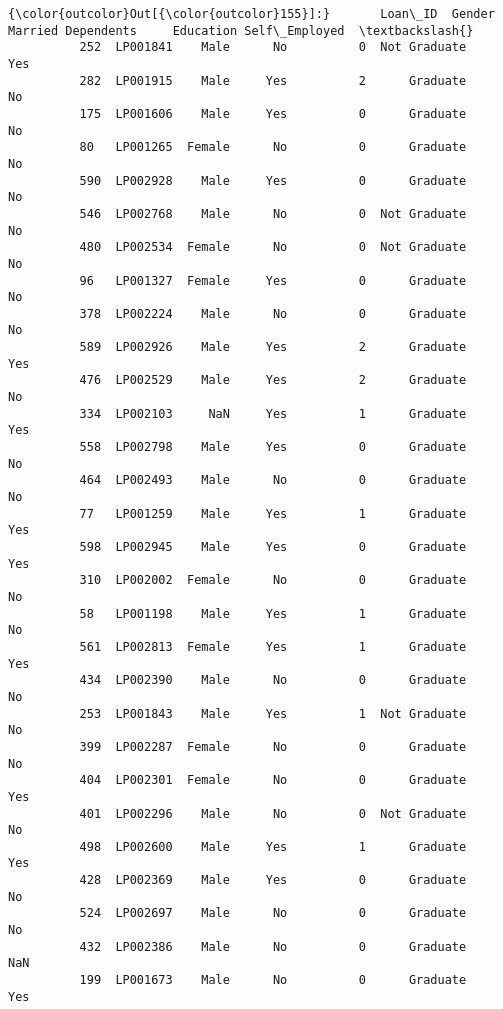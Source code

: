 \documentclass[11pt]{article}
\begin{document}
\begin{Verbatim}[commandchars=\\\{\}]
{\color{outcolor}Out[{\color{outcolor}155}]:}       Loan\_ID  Gender Married Dependents     Education Self\_Employed  \textbackslash{}
          252  LP001841    Male      No          0  Not Graduate           Yes   
          282  LP001915    Male     Yes          2      Graduate            No   
          175  LP001606    Male     Yes          0      Graduate            No   
          80   LP001265  Female      No          0      Graduate            No   
          590  LP002928    Male     Yes          0      Graduate            No   
          546  LP002768    Male      No          0  Not Graduate            No   
          480  LP002534  Female      No          0  Not Graduate            No   
          96   LP001327  Female     Yes          0      Graduate            No   
          378  LP002224    Male      No          0      Graduate            No   
          589  LP002926    Male     Yes          2      Graduate           Yes   
          476  LP002529    Male     Yes          2      Graduate            No   
          334  LP002103     NaN     Yes          1      Graduate           Yes   
          558  LP002798    Male     Yes          0      Graduate            No   
          464  LP002493    Male      No          0      Graduate            No   
          77   LP001259    Male     Yes          1      Graduate           Yes   
          598  LP002945    Male     Yes          0      Graduate           Yes   
          310  LP002002  Female      No          0      Graduate            No   
          58   LP001198    Male     Yes          1      Graduate            No   
          561  LP002813  Female     Yes          1      Graduate           Yes   
          434  LP002390    Male      No          0      Graduate            No   
          253  LP001843    Male     Yes          1  Not Graduate            No   
          399  LP002287  Female      No          0      Graduate            No   
          404  LP002301  Female      No          0      Graduate           Yes   
          401  LP002296    Male      No          0  Not Graduate            No   
          498  LP002600    Male     Yes          1      Graduate           Yes   
          428  LP002369    Male     Yes          0      Graduate            No   
          524  LP002697    Male      No          0      Graduate            No   
          432  LP002386    Male      No          0      Graduate           NaN   
          199  LP001673    Male      No          0      Graduate           Yes   

\end{Verbatim}
\end{document}
